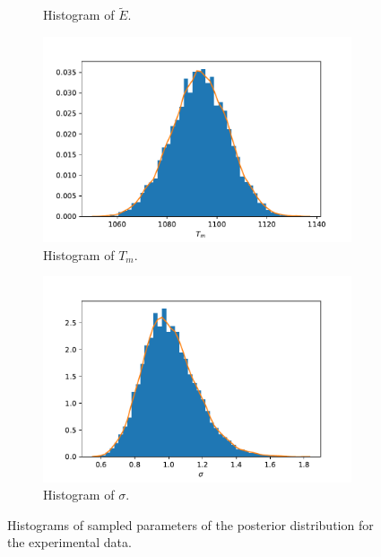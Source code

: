 \begin{figure}[h!]
\begin{subfigure}{.5\textwidth}
  \caption{Histogram of $\tilde{E}$.}
  \label{fig:1EXPE}
\end{subfigure}
\newline
\begin{subfigure}{.5\textwidth}
  \centering
  \includegraphics[width=\linewidth]{figures/bayesian/1_reaction/EXP/hist_Tm.pdf}
  \caption{Histogram of $T_m$.}
  \label{fig:1EXPTm}
\end{subfigure}%
\begin{subfigure}{.5\textwidth}
  \centering
  \includegraphics[width=\linewidth]{figures/bayesian/1_reaction/EXP/hist_sigma.pdf}
  \caption{Histogram of $\sigma$.}
  \label{fig:1EXPsigma}
\end{subfigure}
    \caption{Histograms of sampled parameters of the posterior distribution for the experimental data.}%
    \label{fig:EXP1}%
\end{figure}%

